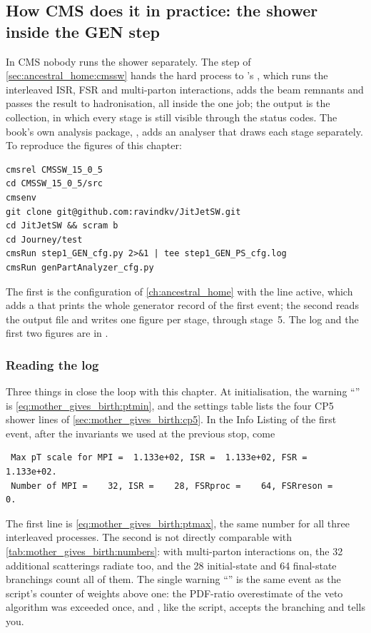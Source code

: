 \subsection{How CMS does it in practice: the shower inside the GEN step}
\label{sec:mother_gives_birth:cmssw}

In CMS nobody runs the shower separately. The  step of
\cref{sec:ancestral_home:cmssw} hands the hard process to \PYTHIA's
, which runs the interleaved ISR, FSR and multi-parton
interactions, adds the beam remnants and passes the result to
hadronisation, all inside the one  job; the output is the
 collection, in which every stage is still visible
through the status codes. The book's own analysis package,
, adds an analyser that draws each stage separately. To
reproduce the figures of this chapter:
\begin{verbatim}
cmsrel CMSSW_15_0_5
cd CMSSW_15_0_5/src
cmsenv
git clone git@github.com:ravindkv/JitJetSW.git
cd JitJetSW && scram b
cd Journey/test
cmsRun step1_GEN_cfg.py 2>&1 | tee step1_GEN_PS_cfg.log
cmsRun genPartAnalyzer_cfg.py
\end{verbatim}
The first  is the configuration of \cref{ch:ancestral_home}
with the  line active, which adds a
 that prints the whole generator record of the
first event; the second reads the output file and writes one figure per
stage,  through
stage~5. The log and the first two figures are in
.

\subsubsection{Reading the log}

Three things in  close the loop with this
chapter. At initialisation, the warning
``'' is
\cref{eq:mother_gives_birth:ptmin}, and the settings table lists the four
CP5 shower lines of \cref{sec:mother_gives_birth:cp5}. In the Info Listing
of the first event, after the invariants we used at the previous stop, come
\begin{verbatim}
 Max pT scale for MPI =  1.133e+02, ISR =  1.133e+02, FSR =  1.133e+02.
 Number of MPI =    32, ISR =    28, FSRproc =    64, FSRreson =     0.
\end{verbatim}
The first line is \cref{eq:mother_gives_birth:ptmax}, the same number for
all three interleaved processes. The second is not directly comparable with
\cref{tab:mother_gives_birth:numbers}: with multi-parton interactions on,
the 32 additional scatterings radiate too, and the 28 initial-state and 64
final-state branchings count all of them. The single warning
``'' is the same
event as the script's counter of weights above one: the PDF-ratio
overestimate of the veto algorithm was exceeded once, and \PYTHIA, like the
script, accepts the branching and tells you.

